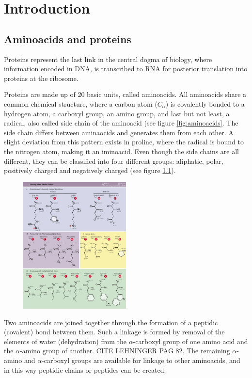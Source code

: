 \documentclass[11pt, a4paper]{report}
\begin{document}
\chapter{Introduction}

\section{Aminoacids and proteins}

Proteins represent the last link in the central dogma of biology, where information encoded in DNA, is transcribed to RNA for posterior translation into proteins at the ribosome.

Proteins are made up of 20 basic units, called aminoacids. All aminoacids share a common chemical structure, where a carbon atom ($C_\alpha$) is covalently bonded to a hydrogen atom, a carboxyl group, an amino group, and last but not least, a radical, also called side chain of the aminoacid (see figure \ref{fig:aminoacids}. The side chain differs between aminaocids and generates them from each other. A slight deviation from this pattern exists in proline, where the radical is bound to the nitrogen atom, making it an iminoacid. Even though the side chains are all different, they can be classified into four different groups: aliphatic, polar, positively charged and negatively charged (see figure \ref{fig:aminaocids}).

\begin{figure}
  \centering
  \includegraphics[width=0.5\textwidth]{aminoacids.png}
  \caption{}
  \label{fig:aminaocids}
\end{figure}

Two aminoacids are joined together through the formation of a peptidic (covalent) bond between them. Such a linkage is formed by removal of the elements of water (dehydration) from the $\alpha$-carboxyl group of one amino acid and the $\alpha$-amino group of another. CITE LEHNINGER PAG 82. The remaining $\alpha$-amino and $\alpha$-carboxyl groups are available for linkage to other aminoacids, and in this way peptidic chains or peptides can be created.
\end{document}
